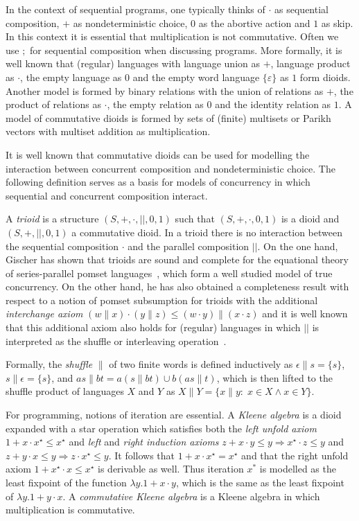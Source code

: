 \documentclass{llncs}
\begin{document}
In the context of sequential programs, one typically thinks of $\cdot$
as sequential composition, $+$ as nondeterministic choice, $0$ as the
abortive action and $1$ as skip. In this context it is essential that
multiplication is not commutative. Often we use $;$ for sequential
composition when discussing programs. More formally, it is well known
that (regular) languages with language union as $+$, language
product as $\cdot$, the empty language as $0$ and the empty word
language $\{\varepsilon\}$ as $1$ form dioids. Another model is formed
by binary relations with the union of relations as $+$, the product of
relations as $\cdot$, the empty relation as $0$ and the identity
relation as $1$. A model of commutative dioids is formed by sets of
(finite) multisets or Parikh vectors with multiset addition as
multiplication.

It is well known that commutative dioids can be used for modelling the
interaction between concurrent composition and nondeterministic
choice. The following definition serves as a basis for models of
concurrency in which sequential and concurrent composition
interact.

A \emph{trioid} is a structure $(S,+,\cdot,||,0,1)$ such that
$(S,+,\cdot,0,1)$ is a dioid and $(S,+,||,0,1)$ a commutative
dioid. In a trioid there is no interaction between the sequential
composition $\cdot$ and the parallel composition $||$. On the one
hand, Gischer has shown that trioids are sound and complete for the
equational theory of series-parallel pomset languages~\cite{gischer_equational_1988},
which form a well studied model of true concurrency. On the other
hand, he has also obtained a completeness result with respect to a
notion of pomset subsumption for trioids with the additional
\emph{interchange axiom} $(w \| x) \cdot (y \| z) \le (w \cdot y) \|
(x \cdot z)$ and it is well known that this additional axiom also
holds for (regular) languages in which $||$ is interpreted as the
shuffle or interleaving operation~\cite{gischer_shuffle_1981}.

Formally, the \emph{shuffle} $\|$ of two finite words is defined
inductively as $\epsilon \| s = \{s\}$, $s \| \epsilon = \{s\}$, and
$as \| bt = a(s \| bt) \cup b(as \| t)$, which is then lifted to the
shuffle product of languages $X$ and $Y$ as $X \| Y = \{x \| y:\; x
\in X \land x \in Y\}$.

For programming, notions of iteration are essential. A \emph{Kleene
  algebra} is a dioid expanded with a star operation which satisfies
both the \emph{left unfold axiom} $1 + x\cdot x^\star\le x^\star$ and
\emph{left} and \emph{right induction axioms} $z+x \cdot y \le
y\Rightarrow x^\star\cdot z \le y$ and $z + y\cdot x \le y \Rightarrow
z\cdot x^\star \le y$. It follows that $1+x\cdot x^\star = x^\star$
and that the right unfold axiom $1+x^\star\cdot x\le x^\star$ is
derivable as well. Thus iteration $x^\ast$ is modelled as the least
fixpoint of the function $\lambda y. 1+x\cdot y$, which is the same as
the least fixpoint of $\lambda y.1+ y\cdot x$. A \emph{commutative
  Kleene algebra} is a Kleene algebra in which multiplication is
commutative.
\end{document}
